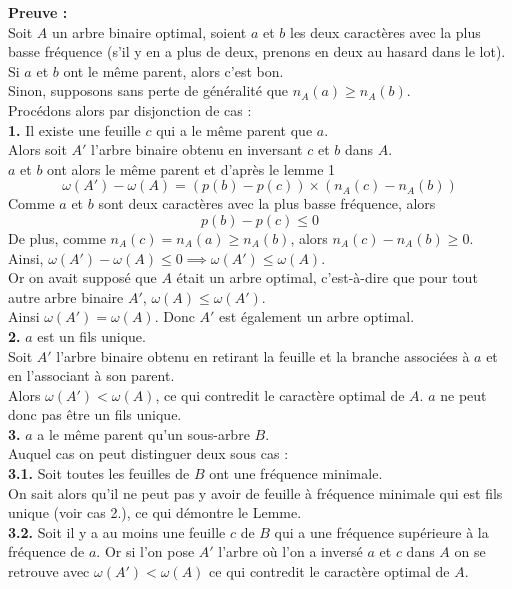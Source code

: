 \documentclass[a4paper, 12pt]{article}
\let\qed\square
\begin{document}
\textbf{Preuve :} \\
Soit $A$ un arbre binaire optimal, soient $a$ et $b$ les deux caractères avec la plus basse fréquence (s'il y en a plus de deux, prenons en deux au hasard dans le lot). \\
Si $a$ et $b$ ont le même parent, alors c'est bon. \\
Sinon, supposons sans perte de généralité que $n_A(a) \geq n_A(b)$. \\
Procédons alors par disjonction de cas : \\
\textbf{1.} Il existe une feuille $c$ qui a le même parent que $a$. \\
Alors soit $A'$ l'arbre binaire obtenu en inversant $c$ et $b$ dans $A$. \\
$a$ et $b$ ont alors le même parent et d'après le lemme 1
$$
\omega(A')-\omega(A) = (p(b) - p(c))\times(n_A(c) - n_A(b))
$$
Comme $a$ et $b$ sont deux caractères avec la plus basse fréquence, alors
$$
p(b)-p(c) \leq 0
$$
De plus, comme $n_A(c) = n_A(a) \geq n_A(b)$, alors $n_A(c)-n_A(b) \geq 0$. \\
Ainsi, $\omega(A')-\omega(A) \leq 0 \implies \omega(A') \leq \omega(A)$. \\
Or on avait supposé que $A$ était un arbre optimal, c'est-à-dire que pour tout autre arbre binaire $A'$, $\omega(A) \leq \omega(A')$. \\
Ainsi $\omega(A') = \omega(A)$. Donc $A'$ est également un arbre optimal. \\
\textbf{2.} $a$ est un fils unique. \\
Soit $A'$ l'arbre binaire obtenu en retirant la feuille et la branche associées à $a$ et en l'associant à son parent. \\
Alors $\omega(A') < \omega(A)$, ce qui contredit le caractère optimal de $A$. $a$ ne peut donc pas être un fils unique. \\
\textbf{3.} $a$ a le même parent qu'un sous-arbre $B$. \\
Auquel cas on peut distinguer deux sous cas : \\
\textbf{3.1.} Soit toutes les feuilles de $B$ ont une fréquence minimale. \\
On sait alors qu'il ne peut pas y avoir de feuille à fréquence minimale qui est fils unique (voir cas 2.), ce qui démontre le Lemme. \\
\textbf{3.2.} Soit il y a au moins une feuille $c$ de $B$ qui a une fréquence supérieure à la fréquence de $a$. Or si l'on pose $A'$ l'arbre où l'on a inversé $a$ et $c$ dans $A$ on se retrouve avec $\omega(A') < \omega(A)$ ce qui contredit le caractère optimal de $A$. \\
\qed
\end{document}
